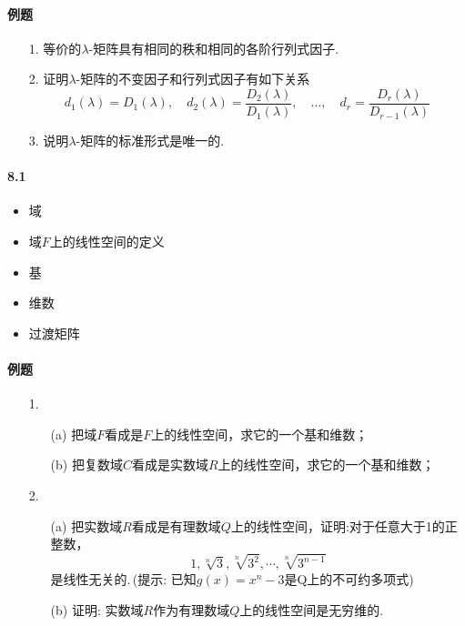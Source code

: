 \paragraph{例题}
\begin{itemize}
  \item[1.] 等价的$\lambda$-矩阵具有相同的秩和相同的各阶行列式因子.
  \vspace{2cm}
  \item[2.] 证明$\lambda$-矩阵的不变因子和行列式因子有如下关系
  $$
  d_1(\lambda) = D_1(\lambda),\quad
  d_2(\lambda) = \frac{D_2(\lambda)}{D_1(\lambda)},\quad
  \dots, \quad d_r = \frac{D_r(\lambda)}{D_{r-1}(\lambda)}
  $$ 
  \vspace{3cm}
  \item[3.] 说明$\lambda$-矩阵的标准形式是唯一的.
  \vspace{2cm} 
\end{itemize}

\paragraph{8.1}
\begin{itemize}
    \item 域
    \item 域$F$上的线性空间的定义
    \item 基
    \item 维数
    \item 过渡矩阵
\end{itemize}

\paragraph{例题}
\begin{itemize}
  \item[1.]
  \begin{itemize}
    \item [(a)] 把域$F$看成是$F$上的线性空间，求它的一个基和维数；
    \item [(b)] 把复数域$C$看成是实数域$R$上的线性空间，求它的一个基和维数；
  \end{itemize}
\end{itemize}
\vspace{1cm}

\begin{itemize}
  \item[2.]
  \begin{itemize}
    \item [(a)] 把实数域$R$看成是有理数域$Q$上的线性空间，证明:对于任意大于1的正整数，
  $$1, \sqrt[n]{3}, \sqrt[n]{3^2}, \cdots, \sqrt[n]{3^{n-1}}$$
  是线性无关的.\,(提示: 已知$g(x) = x^n-3$是Q上的不可约多项式)
    \item [(b)] 证明: 实数域$R$作为有理数域$Q$上的线性空间是无穷维的.
  \end{itemize}
\end{itemize}
\vspace{1.5cm}


